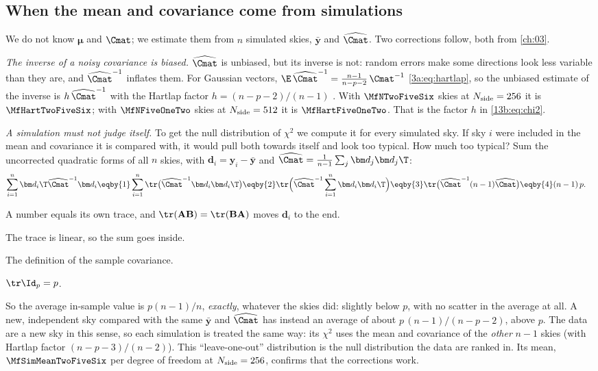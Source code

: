 \subsection{When the mean and covariance come from simulations}
\label{13b:sec:hartlap}

We do not know $\bm\mu$ and $\Cmat$; we estimate them from $n$ simulated skies, $\bar{\bm y}$ and
$\widehat{\Cmat}$. Two corrections follow, both from \cref{ch:03}.

\emph{The inverse of a noisy covariance is biased.} $\widehat{\Cmat}$ is unbiased, but its inverse is not: random
errors make some directions look less variable than they are, and $\widehat{\Cmat}^{-1}$ inflates them.
For Gaussian vectors, $\E\,\widehat{\Cmat}^{-1}=\frac{n-1}{n-p-2}\,\Cmat^{-1}$ \eqref{3a:eq:hartlap}, so the
unbiased estimate of the inverse is $h\,\widehat{\Cmat}^{-1}$ with the Hartlap factor $h=(n-p-2)/(n-1)$
\cite{Hartlap2007}. With $\MfNTwoFiveSix$ skies at $N_{\rm side}=256$ it is $\MfHartTwoFiveSix$; with
$\MfNFiveOneTwo$ skies at $N_{\rm side}=512$ it is $\MfHartFiveOneTwo$. That is the factor $h$ in \eqref{13b:eq:chi2}.

\emph{A simulation must not judge itself.} To get the null distribution of $\chi^2$ we compute it for every
simulated sky. If sky $i$ were included in the mean and covariance it is compared with, it would pull both
towards itself and look too typical. How much too typical? Sum the uncorrected quadratic forms of all $n$ skies,
with $\bm d_i=\bm y_i-\bar{\bm y}$ and $\widehat{\Cmat}=\frac1{n-1}\sum_j\bm d_j\bm d_j\T$:
\begin{align}
  \sum_{i=1}^n\bm d_i\T\widehat{\Cmat}^{-1}\bm d_i
  &\eqby{1}\sum_{i=1}^n\tr\bigl(\widehat{\Cmat}^{-1}\bm d_i\bm d_i\T\bigr)
   \eqby{2}\tr\Bigl(\widehat{\Cmat}^{-1}\sum_{i=1}^n\bm d_i\bm d_i\T\Bigr)
   \eqby{3}\tr\bigl(\widehat{\Cmat}^{-1}(n-1)\widehat{\Cmat}\bigr)
   \eqby{4}(n-1)\,p .
  \label{13b:eq:insample}
\end{align}
\begin{explain}
  \item A number equals its own trace, and $\tr(\mathbf A\mathbf B)=\tr(\mathbf B\mathbf A)$ moves $\bm d_i$ to the end.
  \item The trace is linear, so the sum goes inside.
  \item The definition of the sample covariance.
  \item $\tr\Id_p=p$.
\end{explain}
So the average in-sample value is $p(n-1)/n$, \emph{exactly}, whatever the skies did: slightly below $p$, with no
scatter in the average at all. A new, independent sky compared with the same $\bar{\bm y}$ and $\widehat{\Cmat}$ has
instead an average of about $p\,(n-1)/(n-p-2)$, above $p$. The data are a new sky in this sense, so each simulation
is treated the same way: its $\chi^2$ uses the mean and covariance of the \emph{other} $n-1$ skies (with Hartlap factor
$(n-p-3)/(n-2)$). This ``leave-one-out'' distribution is the null distribution the data are ranked in. Its mean,
$\MfSimMeanTwoFiveSix$ per degree of freedom at $N_{\rm side}=256$, confirms that the corrections work.

